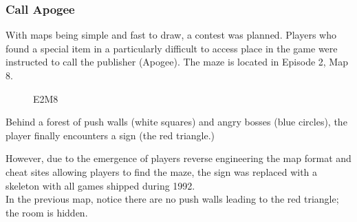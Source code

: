 \subsubsection{Call Apogee}
With maps being simple and fast to draw, a contest was planned. Players who found a special item in a particularly difficult to access place in the game were instructed to call the publisher (Apogee). The maze is located in Episode 2, Map 8.\\
\par
\begin{figure}[H]
  \centering
 \caption{E2M8}
\end{figure}

\par

\begin{minipage}{.5\textwidth}
Behind a forest of push walls (white squares) and angry bosses (blue circles), the player finally encounters a sign (the red triangle.) \\
\par 
However, due to the emergence of players reverse engineering the map format and cheat sites allowing players to find the maze, the sign was replaced with a skeleton with all games shipped during 1992.\\ In the previous map, notice there are no push walls leading to the red triangle; the room is hidden.\\
 \end{minipage}
\begin{minipage}{.5\textwidth}
\begin{figure}[H]
 \centering
\end{figure}
\end{minipage}

